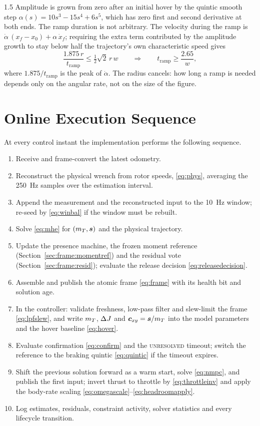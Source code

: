 \begin{spacing}{1.5}
Amplitude is grown from zero after an initial hover by the quintic smooth step
$\alpha(s) = 10s^3-15s^4+6s^5$, which has zero first and second derivative at
both ends. The ramp duration is not arbitrary. The velocity during the ramp is
$\dot\alpha\,(x_f-x_0) + \alpha\,\dot x_f$; requiring the extra term contributed
by the amplitude growth to stay below half the trajectory's own characteristic
speed gives
\begin{equation}
\frac{1.875\,r}{t_{\mathrm{ramp}}} \le \tfrac{1}{2}\sqrt{2}\,r\,w
\qquad\Longrightarrow\qquad
t_{\mathrm{ramp}} \ge \frac{2.65}{w},
\label{eq:ramp}
\end{equation}
where $1.875/t_{\mathrm{ramp}}$ is the peak of $\dot\alpha$. The radius cancels:
how long a ramp is needed depends only on the angular rate, not on the size of
the figure.

\section{Online Execution Sequence}\label{sec:frame:sequence}

At every control instant the implementation performs the following sequence.

\begin{enumerate}
\item Receive and frame-convert the latest odometry.
\item Reconstruct the physical wrench from rotor speeds, \eqref{eq:phys},
averaging the \SI{250}{\hertz} samples over the estimation interval.
\item Append the measurement and the reconstructed input to the \SI{10}{\hertz}
window; re-seed by \eqref{eq:winbal} if the window must be rebuilt.
\item Solve \eqref{eq:mhe} for $(m_T,\bm{s})$ and the physical trajectory.
\item Update the presence machine, the frozen moment reference
(Section~\ref{sec:frame:momentref}) and the residual vote
(Section~\ref{sec:frame:resid}); evaluate the release decision
\eqref{eq:releasedecision}.
\item Assemble and publish the atomic frame \eqref{eq:frame} with its health bit
and solution age.
\item In the controller: validate freshness, low-pass filter and slew-limit the
frame \eqref{eq:lpfslew}, and write $m_T$, $\Delta J$ and $\bm{c}_{xy}=\bm{s}/m_T$ into the
model parameters and the hover baseline \eqref{eq:hover}.
\item Evaluate confirmation \eqref{eq:confirm} and the \textsc{unresolved}
timeout; switch the reference to the braking quintic \eqref{eq:quintic} if the
timeout expires.
\item Shift the previous solution forward as a warm start, solve
\eqref{eq:nmpc}, and publish the first input; invert thrust to throttle by
\eqref{eq:throttleinv} and apply the body-rate scaling
\eqref{eq:omegascale}--\eqref{eq:headroomapply}.
\item Log estimates, residuals, constraint activity, solver statistics and every
lifecycle transition.
\end{enumerate}


\end{spacing}

